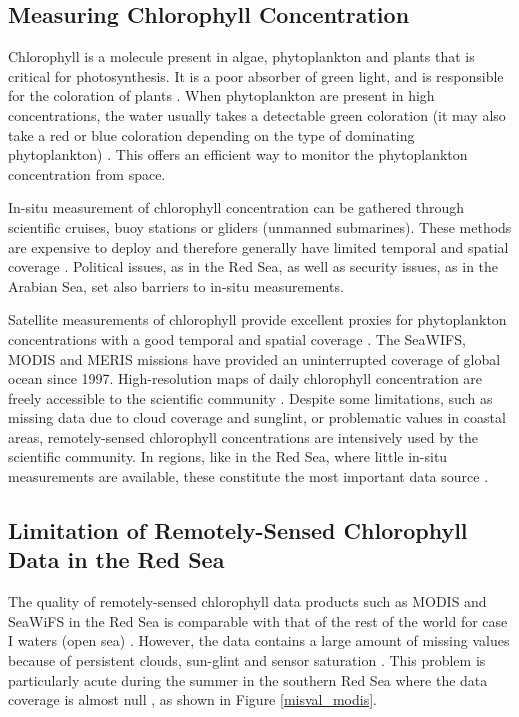 \subsection{Measuring Chlorophyll Concentration}

Chlorophyll is a molecule present in algae, phytoplankton and plants that is
critical for photosynthesis. It is a poor absorber of green light, and is
responsible for the coloration of plants \citep{Pal2014}. When phytoplankton
are present in high concentrations, the water usually takes a detectable green
coloration (it may also take a red or blue coloration depending on the type of
dominating phytoplankton) \citep{Robinson2010}. This offers an efficient way to
monitor the phytoplankton concentration from space.

In-situ measurement of chlorophyll concentration can be gathered through
scientific cruises, buoy stations or gliders (unmanned submarines). These
methods are expensive to deploy and therefore generally have limited temporal
and spatial coverage \citep{Robinson2010}. Political issues, as in the Red Sea,
as well as security issues, as in the Arabian Sea, set also barriers to in-situ
measurements.

Satellite measurements of chlorophyll provide excellent proxies for
phytoplankton concentrations with a good temporal and spatial coverage
\citep{Robinson2010}. The SeaWIFS, MODIS and MERIS missions have provided an
uninterrupted coverage of global ocean since 1997. High-resolution maps of
daily chlorophyll concentration are freely accessible to the scientific
community \citep{McClain2009}. Despite some limitations, such as missing data
due to cloud coverage and sunglint, or problematic values in coastal areas,
remotely-sensed chlorophyll concentrations are intensively used by the
scientific community. In regions, like in the Red Sea, where little in-situ
measurements are available, these constitute the most important data source
\citep{Raitsos2013, Brewin2013}.

\subsection{Limitation of Remotely-Sensed Chlorophyll Data in the Red Sea}

The quality of remotely-sensed chlorophyll data products such as MODIS and
SeaWiFS in the Red Sea is comparable with that of the rest of the world for
case I waters (open sea) \citep{Brewin2013}. However, the data contains a large
amount of missing values because of persistent clouds, sun-glint and sensor
saturation \citep{Racault}. This problem is particularly acute during the
summer in the southern Red Sea where the data coverage is almost null
\citep{Racault}, as shown in Figure \ref{misval_modis}.

